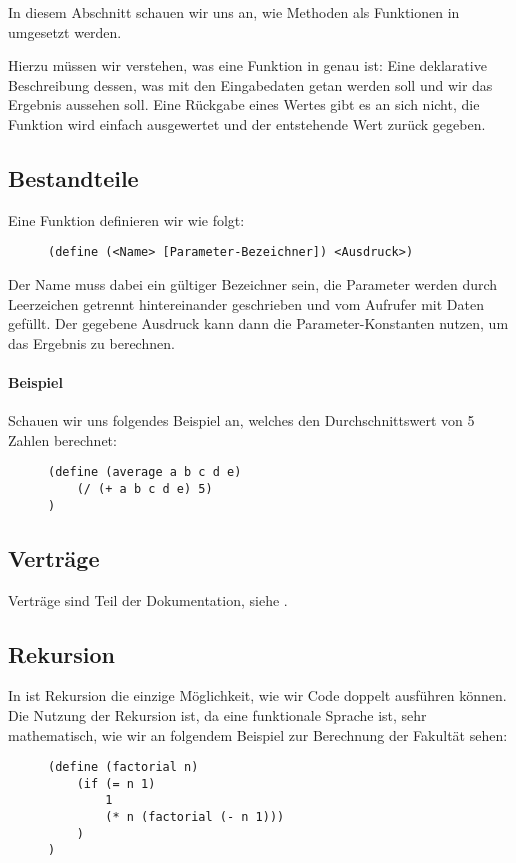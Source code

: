 
In diesem Abschnitt schauen wir uns an, wie Methoden als Funktionen in \racketText umgesetzt werden.

Hierzu müssen wir verstehen, was eine Funktion in \racketText genau ist: Eine deklarative Beschreibung dessen, was mit den Eingabedaten getan werden soll und wir das Ergebnis aussehen soll. Eine Rückgabe eines Wertes gibt es an sich nicht, die Funktion wird einfach ausgewertet und der entstehende Wert zurück gegeben.

\subsection{Bestandteile} %
	Eine Funktion definieren wir wie folgt:
	\begin{figure}[H]
		\centering
		\lstinline[language = Racket]|(define (<Name> [Parameter-Bezeichner]) <Ausdruck>)|
	\end{figure}
	Der Name muss dabei ein gültiger Bezeichner sein, die Parameter werden durch Leerzeichen getrennt hintereinander geschrieben und vom Aufrufer mit Daten gefüllt. Der gegebene Ausdruck kann dann die Parameter-Konstanten nutzen, um das Ergebnis zu berechnen.
	
	\paragraph{Beispiel}
		Schauen wir uns folgendes Beispiel an, welches den Durchschnittswert von 5 Zahlen berechnet:
		\begin{figure}[H]
			\centering
			\begin{lstlisting}[language = Racket]
(define (average a b c d e)
	(/ (+ a b c d e) 5)
)
\end{lstlisting}
		\end{figure}

\subsection{Verträge}
	Verträge sind Teil der Dokumentation, siehe .

\subsection{Rekursion}
	
	In \racketText ist Rekursion die einzige Möglichkeit, wie wir Code doppelt ausführen können. Die Nutzung der Rekursion ist, da \racketText eine funktionale Sprache ist, sehr mathematisch, wie wir an folgendem Beispiel zur Berechnung der Fakultät sehen:
	\begin{figure}[H]
		\centering
		\begin{lstlisting}[language = Racket]
(define (factorial n)
	(if (= n 1)
		1
		(* n (factorial (- n 1)))
	)
)
\end{lstlisting}
	\end{figure}
